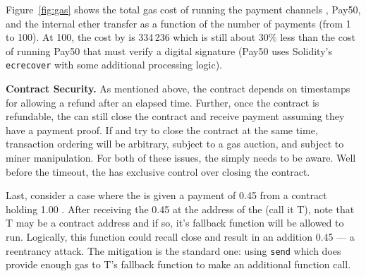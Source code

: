 Figure~\ref{fig:gas} shows the total gas cost of running the payment channels \ew, \textsf{Pay50}, and the internal  ether transfer as a function of the number of payments (from 1 to 100). At 100, the cost by \eww is 334\,236 which is still about 30\% less than the cost of running \textsf{Pay50} that must verify a digital signature (\ie \textsf{Pay50} uses Solidity's \texttt{ecrecover} with some additional processing logic).

\textbf{Contract Security.} As mentioned above, the contract depends on timestamps for allowing a refund after an elapsed time. Further, once the contract is refundable, the \take can still close the contract and receive payment assuming they have a payment proof. If \take and \make try to close the contract at the same time, transaction ordering will be arbitrary, subject to a gas auction, and subject to miner manipulation. For both of these issues, the \take simply needs to be aware. Well before the timeout, the \take has exclusive control over closing the contract. 

Last, consider a case where the \take is given a payment of 0.45 \eth from a contract holding 1.00 \eth. After receiving the 0.45 \eth at the address of the \take (call it T), note that T may be a contract address and if so, it's fallback function will be allowed to run. Logically, this function could recall close and result in an addition 0.45 \eth --- a reentrancy attack. The mitigation is the standard one: using \texttt{send} which does provide enough gas to  T's fallback function to make an additional function call. 



